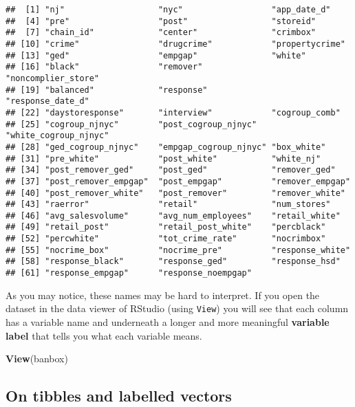 \documentclass[
]{book}
\newenvironment{Shaded}{\begin{snugshade}}{\end{snugshade}}
\newcommand{\FunctionTok}[1]{\textcolor[rgb]{0.13,0.29,0.53}{\textbf{#1}}}
\newcommand{\NormalTok}[1]{#1}
\begin{document}
\begin{verbatim}
##  [1] "nj"                   "nyc"                  "app_date_d"          
##  [4] "pre"                  "post"                 "storeid"             
##  [7] "chain_id"             "center"               "crimbox"             
## [10] "crime"                "drugcrime"            "propertycrime"       
## [13] "ged"                  "empgap"               "white"               
## [16] "black"                "remover"              "noncomplier_store"   
## [19] "balanced"             "response"             "response_date_d"     
## [22] "daystoresponse"       "interview"            "cogroup_comb"        
## [25] "cogroup_njnyc"        "post_cogroup_njnyc"   "white_cogroup_njnyc" 
## [28] "ged_cogroup_njnyc"    "empgap_cogroup_njnyc" "box_white"           
## [31] "pre_white"            "post_white"           "white_nj"            
## [34] "post_remover_ged"     "post_ged"             "remover_ged"         
## [37] "post_remover_empgap"  "post_empgap"          "remover_empgap"      
## [40] "post_remover_white"   "post_remover"         "remover_white"       
## [43] "raerror"              "retail"               "num_stores"          
## [46] "avg_salesvolume"      "avg_num_employees"    "retail_white"        
## [49] "retail_post"          "retail_post_white"    "percblack"           
## [52] "percwhite"            "tot_crime_rate"       "nocrimbox"           
## [55] "nocrime_box"          "nocrime_pre"          "response_white"      
## [58] "response_black"       "response_ged"         "response_hsd"        
## [61] "response_empgap"      "response_noempgap"
\end{verbatim}

As you may notice, these names may be hard to interpret. If you open the dataset in the data viewer of RStudio (using \texttt{View}) you will see that each column has a variable name and underneath a longer and more meaningful \textbf{variable label} that tells you what each variable means.

\begin{Shaded}
\begin{Highlighting}[]
\FunctionTok{View}\NormalTok{(banbox)}
\end{Highlighting}
\end{Shaded}

\subsection{On tibbles and labelled vectors}\label{on-tibbles-and-labelled-vectors}
\end{document}
